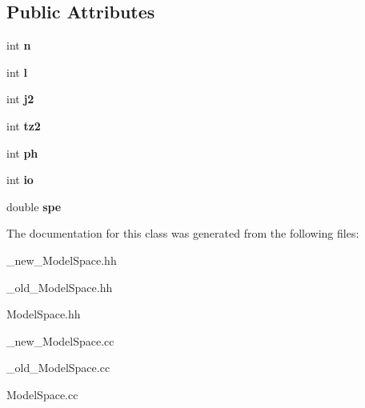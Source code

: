 \subsection*{Public Attributes}
\begin{DoxyCompactItemize}
\item 
\hypertarget{classOrbit_a61c756b2fd626b9222fea5a2b4622eca}{int {\bfseries n}}\label{classOrbit_a61c756b2fd626b9222fea5a2b4622eca}

\item 
\hypertarget{classOrbit_a3b03c063df7856524db81274331d0e4b}{int {\bfseries l}}\label{classOrbit_a3b03c063df7856524db81274331d0e4b}

\item 
\hypertarget{classOrbit_a039f1fb20d41a2227bb61c2078e67d8b}{int {\bfseries j2}}\label{classOrbit_a039f1fb20d41a2227bb61c2078e67d8b}

\item 
\hypertarget{classOrbit_a9f9a4be881aa8b960b43fb3171617816}{int {\bfseries tz2}}\label{classOrbit_a9f9a4be881aa8b960b43fb3171617816}

\item 
\hypertarget{classOrbit_ad7624269be701b6b21555321818022d8}{int {\bfseries ph}}\label{classOrbit_ad7624269be701b6b21555321818022d8}

\item 
\hypertarget{classOrbit_ad0158269c44e38113a3da3ce0b94e638}{int {\bfseries io}}\label{classOrbit_ad0158269c44e38113a3da3ce0b94e638}

\item 
\hypertarget{classOrbit_a1326ee5ea25114e1ec1f4071168e71d5}{double {\bfseries spe}}\label{classOrbit_a1326ee5ea25114e1ec1f4071168e71d5}

\end{DoxyCompactItemize}


The documentation for this class was generated from the following files\-:\begin{DoxyCompactItemize}
\item 
\-\_\-new\-\_\-\-Model\-Space.\-hh\item 
\-\_\-old\-\_\-\-Model\-Space.\-hh\item 
Model\-Space.\-hh\item 
\-\_\-new\-\_\-\-Model\-Space.\-cc\item 
\-\_\-old\-\_\-\-Model\-Space.\-cc\item 
Model\-Space.\-cc\end{DoxyCompactItemize}
